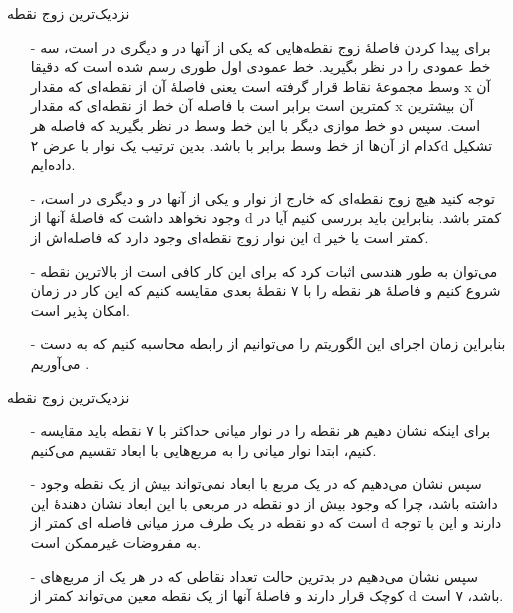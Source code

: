 \begin{frame}{‌نزدیک‌ترین زوج نقطه}
\begin{itemize}\itemr
\item[-]
برای پیدا کردن فاصلهٔ زوج نقطه‌هایی که یکی از آنها در
و دیگری در
است، سه خط عمودی را در نظر بگیرید. خط عمودی اول طوری رسم شده است که دقیقا وسط مجموعهٔ نقاط قرار گرفته است یعنی فاصلهٔ آن از نقطه‌ای که مقدار x آن کمترین است برابر است با فاصله آن خط از نقطه‌ای که مقدار x آن بیشترین است. سپس دو خط موازی دیگر با این خط وسط در نظر بگیرید که فاصله هر کدام از آن‌ها از خط وسط برابر با 
 باشد. بدین ترتیب یک نوار با عرض ۲d تشکیل داده‌ایم.
\item[-]
توجه کنید هیچ زوج نقطه‌ای که خارج از نوار و یکی از آنها در 
و دیگری در 
است،
وجود نخواهد داشت که فاصلهٔ آنها از d کمتر باشد.
بنابراین باید بررسی کنیم آیا در این نوار زوج نقطه‌ای وجود دارد که فاصله‌اش از d کمتر است یا خیر.
\item[-]
می‌توان به طور هندسی اثبات کرد که برای این کار کافی است از بالاترین نقطه شروع ‌کنیم و فاصلهٔ هر نقطه را با ۷ نقطهٔ بعدی مقایسه کنیم که این کار در زمان
امکان پذیر است.
\item[-]
بنابراین زمان اجرای این الگوریتم را می‌توانیم از رابطه
محاسبه کنیم که به دست می‌آوریم
.
\end{itemize}
\end{frame}



\begin{frame}{‌نزدیک‌ترین زوج نقطه}
\begin{itemize}\itemr
\item[-]
برای اینکه نشان دهیم هر نقطه را در نوار میانی حداکثر با ۷ نقطه باید مقایسه کنیم، ابتدا نوار میانی را به مربع‌هایی با ابعاد
تقسیم می‌کنیم.
\item[-]
سپس نشان می‌دهیم که در یک مربع با ابعاد 
نمی‌تواند بیش از یک نقطه وجود داشته باشد، چرا که وجود بیش از دو نقطه در مربعی با این ابعاد نشان دهندهٔ این است که دو نقطه در یک طرف مرز میانی فاصله ای کمتر از d دارند و این با توجه به مفروضات غیرممکن است.
\item[-]
سپس نشان می‌دهیم در بدترین حالت تعداد نقاطی که در هر یک از مربع‌های کوچک قرار دارند و فاصلهٔ آنها از یک نقطه معین می‌تواند کمتر از d باشد، ۷ است.
\end{itemize}
\end{frame}

